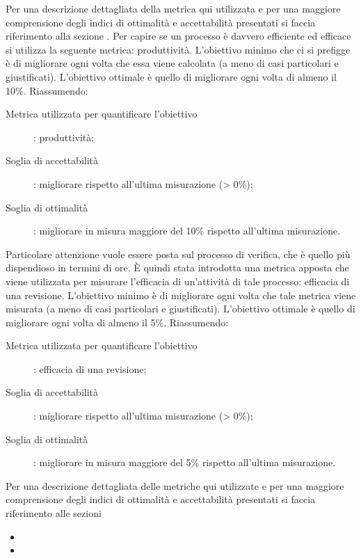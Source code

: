 				Per una descrizione dettagliata della metrica qui utilizzata e per una maggiore comprensione degli indici di ottimalità e accettabilità presentati si faccia riferimento alla sezione .
				Per capire se un processo è davvero efficiente ed efficace si utilizza la seguente metrica: produttività. L'obiettivo minimo che ci si prefigge è di migliorare ogni volta che essa viene calcolata (a meno di casi particolari e giustificati). L'obiettivo ottimale è quello di migliorare ogni volta di almeno il 10\%. Riassumendo:
				\begin{description}
					\item[Metrica utilizzata per quantificare l'obiettivo]: produttività;
					\item[Soglia di accettabilità]: migliorare rispetto all'ultima misurazione (> 0\%);
					\item[Soglia di ottimalità]: migliorare in misura maggiore del 10\% rispetto all'ultima misurazione.
				\end{description}
				Particolare attenzione vuole essere posta sul processo di verifica, che è quello più dispendioso in termini di ore. È quindi stata introdotta una metrica apposta che viene utilizzata per misurare l'efficacia di un'attività di tale processo: efficacia di una revisione. L'obiettivo minimo è di migliorare ogni volta che tale metrica viene misurata (a meno di casi particolari e giustificati). L'obiettivo ottimale è quello di migliorare ogni volta di almeno il 5\%. Riassumendo:
				\begin{description}
					\item[Metrica utilizzata per quantificare l'obiettivo]: efficacia di una revisione;
					\item[Soglia di accettabilità]: migliorare rispetto all'ultima misurazione (> 0\%);
					\item[Soglia di ottimalità]: migliorare in misura maggiore del 5\% rispetto all'ultima misurazione.
				\end{description}
				Per una descrizione dettagliata delle metriche qui utilizzate e per una maggiore comprensione degli indici di ottimalità e accettabilità presentati si faccia riferimento alle sezioni
				\begin{itemize}
					\item {}
					\item {}
				\end{itemize}						


